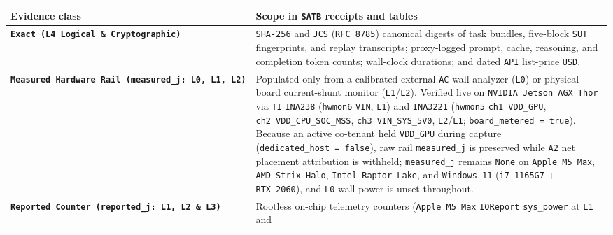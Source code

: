 \documentclass[10pt,letterpaper]{article}
\begin{document}
{\footnotesize\setlength{\tabcolsep}{3.8pt}\renewcommand{\arraystretch}{1.15}
\begin{longtable}[]{@{}
  >{\raggedright\arraybackslash}p{}
  >{\raggedright\arraybackslash}p{}@{}}
\toprule\noalign{}
\begin{minipage}[b]{\linewidth}\raggedright
\textbf{Evidence class}
\end{minipage} & \begin{minipage}[b]{\linewidth}\raggedright
\textbf{Scope in \texttt{SATB} receipts and tables}
\end{minipage} \\
\midrule\noalign{}
\endhead
\bottomrule\noalign{}
\endlastfoot
\textbf{\texttt{Exact\ (\allowbreak{}L4\ Logical\ \&\ Cryptographic)}} &
\texttt{SHA-256} and \texttt{JCS} (\texttt{RFC\ 8785}) canonical digests
of task bundles, five-block \texttt{SUT} fingerprints, and replay
transcripts; proxy-logged prompt, cache, reasoning, and completion token
counts; wall-clock durations; and dated \texttt{API} list-price
\texttt{USD}. \\
\textbf{\texttt{Measured\ Hardware\ Rail\ (\allowbreak{}measured\_\allowbreak{}j:\ L0,\allowbreak{}\ L1,\allowbreak{}\ L2)}}
& Populated only from a calibrated external \texttt{AC} wall analyzer
(\texttt{L0}) or physical board current-shunt monitor
(\texttt{L1}/\allowbreak{}\texttt{L2}). Verified live on
\texttt{NVIDIA\ Jetson\ AGX\ Thor} via \texttt{TI} \texttt{INA238}
(\texttt{hwmon6} \texttt{VIN}, \texttt{L1}) and \texttt{INA3221}
(\texttt{hwmon5} \texttt{ch1\ VDD\_\allowbreak{}GPU},
\texttt{ch2\ VDD\_\allowbreak{}CPU\_\allowbreak{}SOC\_\allowbreak{}MSS}, \texttt{ch3\ VIN\_\allowbreak{}SYS\_\allowbreak{}5V0},
\texttt{L2}/\allowbreak{}\texttt{L1}; \texttt{board\_\allowbreak{}metered\ =\ true}). Because an
active co-tenant held \texttt{VDD\_GPU} during capture
(\texttt{dedicated\_\allowbreak{}host\ =\ false}), raw rail \texttt{measured\_\allowbreak{}j} is
preserved while \texttt{A2} net placement attribution is withheld;
\texttt{measured\_\allowbreak{}j} remains \texttt{None} on \texttt{Apple\ M5\ Max},
\texttt{AMD\ Strix\ Halo}, \texttt{Intel\ Raptor\ Lake}, and
\texttt{Windows\ 11} (\texttt{i7-1165G7} + \texttt{RTX\ 2060}), and
\texttt{L0} wall power is unset throughout. \\
\textbf{\texttt{Reported\ Counter\ (\allowbreak{}reported\_\allowbreak{}j:\ L1,\allowbreak{}\ L2\ \&\ L3)}} &
Rootless on-chip telemetry counters (\texttt{Apple\ M5\ Max}
\texttt{IOReport} \texttt{sys\_\allowbreak{}power} at \texttt{L1} and

\end{longtable}}
\end{document}

